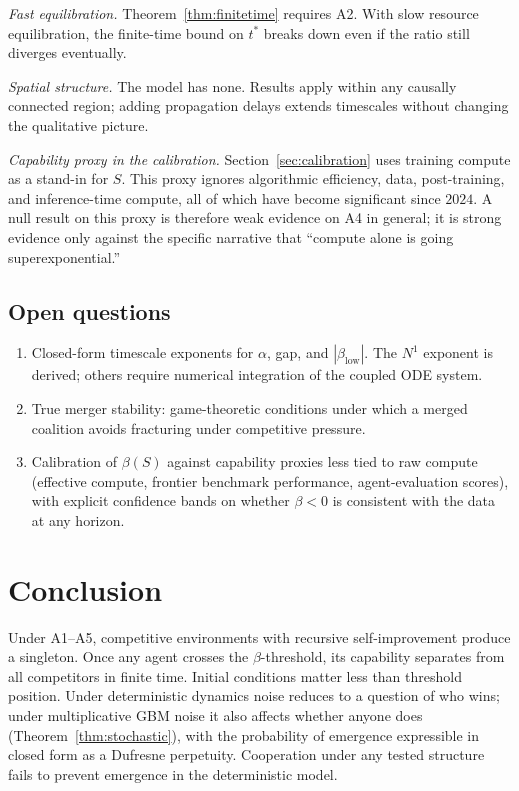 \documentclass[11pt,letterpaper]{article}
\theoremstyle{plain}
\theoremstyle{definition}
\theoremstyle{remark}
\newcommand{\betaL}{\beta_{\mathrm{low}}}
\newcommand{\tstar}{t^{*}}
\begin{document}
\textit{Fast equilibration.}
Theorem~\ref{thm:finitetime} requires A2.
With slow resource equilibration, the finite-time bound on $\tstar$ breaks
down even if the ratio still diverges eventually.

\textit{Spatial structure.}
The model has none.
Results apply within any causally connected region; adding propagation delays
extends timescales without changing the qualitative picture.

\textit{Capability proxy in the calibration.}
Section~\ref{sec:calibration} uses training compute as a stand-in for
$S$.
This proxy ignores algorithmic efficiency, data, post-training, and
inference-time compute, all of which have become significant since
$2024$.
A null result on this proxy is therefore weak evidence on A4 in
general; it is strong evidence only against the specific narrative
that ``compute alone is going superexponential.''

\subsection{Open questions}

\begin{enumerate}[label=(\arabic*)]
\item Closed-form timescale exponents for $\alpha$, gap, and $|\betaL|$.
The $N^1$ exponent is derived; others require numerical integration of the
coupled ODE system.

\item True merger stability: game-theoretic conditions under which a merged
coalition avoids fracturing under competitive pressure.

\item Calibration of $\beta(S)$ against capability proxies less tied
to raw compute (effective compute, frontier benchmark performance,
agent-evaluation scores), with explicit confidence bands on whether
$\beta < 0$ is consistent with the data at any horizon.
\end{enumerate}

\section{Conclusion}
\label{sec:conclusion}

Under A1--A5, competitive environments with recursive self-improvement
produce a singleton.
Once any agent crosses the $\beta$-threshold, its capability separates from
all competitors in finite time.
Initial conditions matter less than threshold position.
Under deterministic dynamics noise reduces to a question of who wins;
under multiplicative GBM noise it also affects whether anyone does
(Theorem~\ref{thm:stochastic}), with the probability of emergence
expressible in closed form as a Dufresne perpetuity.
Cooperation under any tested structure fails to prevent emergence in the
deterministic model.
\end{document}
